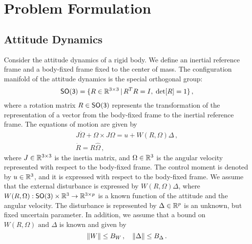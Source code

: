 \documentclass[letterpaper, 10 pt, conference]{ieeeconf}  %
\begin{document}
\section{Problem Formulation}\label{sec:prob_form}
\subsection{Attitude Dynamics}\label{sec:att_dyn}
Consider the attitude dynamics of a rigid body. 
We define an inertial reference frame and a body-fixed frame fixed to the center of mass. 
The configuration manifold of the attitude dynamics is the special orthogonal group:
\begin{align*}
	\mathsf{SO(3)} = \{R\in\mathbb{R}^{3\times 3}\,|\, R^TR=I,\;\mathrm{det}[R]=1\} \, ,
\end{align*}
where a rotation matrix $R\in\mathsf{SO(3)}$ represents the transformation of the representation of a vector from the body-fixed frame to the inertial reference frame. 
The equations of motion are given by
\begin{gather}
	J\dot\Omega + \Omega\times J\Omega = u+W(R,\Omega)\Delta \, ,\label{eqn:Wdot}\\
	\dot R = R\hat\Omega \, ,\label{eqn:Rdot}
\end{gather}
where $J\in\mathbb{R}^{3\times 3}$ is the inertia matrix, and $\Omega\in\mathbb{R}^{3}$ is the angular velocity represented with respect to the body-fixed frame. 
The control moment is denoted by $u\in\mathbb{R}^{3}$, and it is expressed with respect to the body-fixed frame. 
We assume that the external disturbance is expressed by $W(R,\Omega)\Delta$, where $W(R,\Omega):\mathsf{SO(3)}\times\mathbb{R}^{3}\rightarrow \mathbb{R}^{3\times p}$ is a known function of the attitude and the angular velocity.
The disturbance is represented by $\Delta\in\mathbb{R}^{p}$ is an unknown, but fixed uncertain parameter.
In addition, we assume that a bound on \( W(R, \Omega) \text{ and } \Delta \) is known and given by
\begin{equation}
	\left\| W \right\| \leq B_W \, , \quad \left\| \Delta \right\| \leq B_\Delta \,. \label{eqn:W_bound}
\end{equation}
\end{document}
